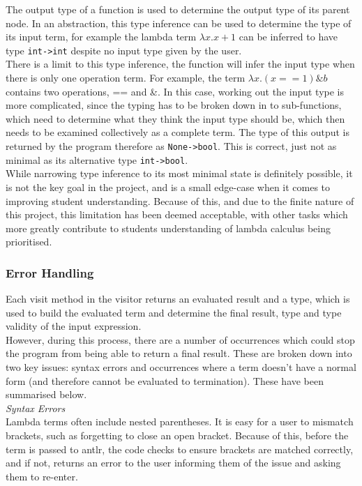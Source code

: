 \documentclass[a4paper,12pt]{report}
\begin{document}
The output type of a function is used to determine the output type of its parent node. In an abstraction, this type inference can be used to determine the type of its input term, for example the lambda term $\lambda x.x+1$ can be inferred to have type \texttt{int->int} despite no input type given by the user.\\

There is a limit to this type inference, the function will infer the input type when there is only one operation term. For example, the term $\lambda x.(x==1)\&b$ contains two operations, == and \&. In this case, working out the input type is more complicated, since the typing has to be broken down in to sub-functions, which need to determine what they think the input type should be, which then needs to be examined collectively as a complete term. The type of this output is returned by the program therefore as \texttt{None->bool}. This is correct, just not as minimal as its alternative type \texttt{int->bool}.\\

While narrowing type inference to its most minimal state is definitely possible, it is not the key goal in the project, and is a small edge-case when it comes to improving student understanding. Because of this, and due to the finite nature of this project, this limitation has been deemed acceptable, with other tasks which more greatly contribute to students understanding of lambda calculus being prioritised.

\subsubsection{Error Handling}
Each visit method in the visitor returns an evaluated result and a type, which is used to build the evaluated term and determine the final result, type and type validity of the input expression.\\

However, during this process, there are a number of occurrences which could stop the program from being able to return a final result. These are broken down into two key issues: syntax errors and occurrences where a term doesn't have a normal form (and therefore cannot be evaluated to termination). These have been summarised below.\\

\textit{Syntax Errors}\\
Lambda terms often include nested parentheses. It is easy for a user to mismatch brackets, such as forgetting to close an open bracket. Because of this, before the term is passed to antlr, the code checks to ensure brackets are matched correctly, and if not, returns an error to the user informing them of the issue and asking them to re-enter.
\end{document}

